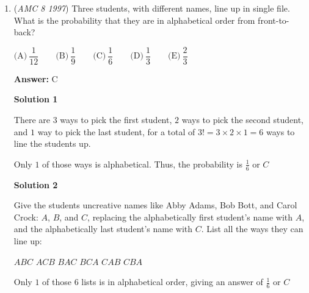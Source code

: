\begin{enumerate}
 $\text{(A)}\ 30 \qquad \text{(B)}\ 60 \qquad \text{(C)}\ 75 \qquad \text{(D)}\ 90 \qquad \text{(E)}\ 120$

 \textbf{Answer: }B



\textbf{Solution}

There are $4\frac{1}{2}$ hours from 7:30 a.m. to noon, and $4$ hours from noon to 4 p.m., meaning Walter was away from home for a total of $8\frac{1}{2}$ hours, or $8.5\times 60 = 510$ minutes.

 Tallying up the times he was not on the bus, he has $6\times 50 = 300$ minutes in classes, $30$ minutes at lunch, and $2\times 60 = 120$ minutes of "additional time".  That is a total of $300 + 30 + 120 = 450$ minutes that Walter was away from home, but not on the bus.

 Therefore, Walter spent $510 - 450 = 60$ minutes on the bus, and the answer is $\boxed{B}$



	\item (\textit{AMC 8 1997}) Three students, with different names, line up in single file.  What is the probability that they are in alphabetical order from front-to-back?


 $\text{(A)}\ \dfrac{1}{12} \qquad \text{(B)}\ \dfrac{1}{9} \qquad \text{(C)}\ \dfrac{1}{6} \qquad \text{(D)}\ \dfrac{1}{3} \qquad \text{(E)}\ \dfrac{2}{3}$

 \textbf{Answer: }C



\textbf{Solution 1}

There are $3$ ways to pick the first student, $2$ ways to pick the second student, and $1$ way to pick the last student, for a total of $3! = 3\times2\times1 = 6$ ways to line the students up.

 Only $1$ of those ways is alphabetical.  Thus, the probability is $\frac{1}{6}$ or $\boxed{C}$




\textbf{Solution 2}

Give the students uncreative names like Abby Adams, Bob Bott, and Carol Crock:  $A$, $B$, and $C$, replacing the alphabetically first student's name with $A$, and the alphabetically last student's name with $C$.  List all the ways they can line up:

 $ABC$
$ACB$
$BAC$
$BCA$
$CAB$
$CBA$

 Only $1$ of those $6$ lists is in alphabetical order, giving an answer of $\frac{1}{6}$ or $\boxed{C}$





\end{enumerate}
